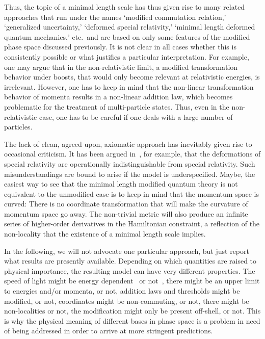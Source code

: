 \documentclass{article}
\begin{document}
Thus, the topic of a minimal length scale has thus given rise to many related approaches that run under
the names `modified commutation relation,' `generalized uncertainty,' `deformed special relativity,'
`minimal length deformed quantum mechanics,' etc.\ and are based on only some features of
the modified phase space discussed previously. It is not clear in all cases whether this is
consistently possible or what justifies a particular interpretation. For example, one may argue
that in the non-relativistic limit, a modified transformation
behavior under boosts, that would only become relevant at relativistic energies, is irrelevant. However, one has to keep in mind that the non-linear
transformation behavior of momenta results in a non-linear addition law, which becomes problematic for the
treatment of multi-particle states. Thus, even in the non-relativistic case, one has to be careful
if one deals with a large number of particles. 

The lack of clean, agreed upon, axiomatic approach
has inevitably given rise to occasional criticism. It has been argued in~\cite{Ahluwalia:2002wf}, for
example, that the
deformations of special relativity are operationally indistinguishable from special relativity. Such
misunderstandings are bound to arise if the model is underspecified. Maybe, the easiest way to see that the minimal length
modified quantum theory is not equivalent to the unmodified case is to keep in mind that the
momentum space is curved: There is no coordinate
transformation that will make the curvature of momentum space go away. The non-trivial metric
will also produce an infinite series of higher-order derivatives in the Hamiltonian constraint, a reflection of the non-locality
that the existence of a minimal length scale implies.


In the following, we will not advocate one particular approach, but just report what results 
are presently available. Depending on which quantities are raised to physical importance, 
the resulting model can have very different properties. The speed of light might be energy dependent~\cite{AmelinoCamelia:1999pm}
or not~\cite{Tamaki:2001ck,Daszkiewicz:2003yr},  there might be an upper limit to energies and/or momenta, or not,
addition laws and thresholds might be modified, or not, coordinates might be non-commuting, or not, there 
might be non-localities or not, the modification might only be present off-shell, or not. This is
why the physical meaning of different bases in phase space is a problem in need of being addressed
in order to arrive at more stringent predictions.
\end{document}
